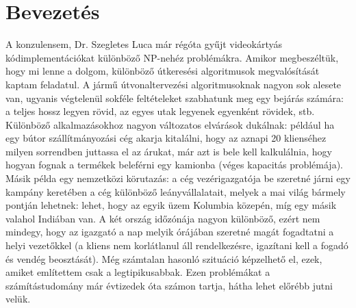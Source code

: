 \chapter{Bevezetés}

A konzulensem, Dr. Szegletes Luca már régóta gyűjt videokártyás kódimplementációkat különböző NP-nehéz problémákra. Amikor megbeszéltük, hogy mi lenne a dolgom, különböző útkeresési algoritmusok megvalósítását kaptam feladatul. A jármű útvonaltervezési algoritmusoknak nagyon sok alesete van, ugyanis végtelenül sokféle feltételeket szabhatunk meg egy bejárás számára: a teljes hossz legyen rövid, az egyes utak legyenek egyenként rövidek, stb. Különböző alkalmazásokhoz nagyon változatos elvárások dukálnak: például ha egy bútor szállítmányozási cég akarja kitalálni, hogy az aznapi 20 klienséhez milyen sorrendben juttassa el az árukat, már azt is bele kell kalkulálnia, hogy hogyan fognak a termékek beleférni egy kamionba (véges kapacitás problémája). Másik példa egy nemzetközi körutazás: a cég vezérigazgatója be szeretné járni egy kampány keretében a cég különböző leányvállalatait, melyek a mai világ bármely pontján lehetnek: lehet, hogy az egyik üzem Kolumbia közepén, míg egy másik valahol Indiában van. A két ország időzónája nagyon különböző, ezért nem mindegy, hogy az igazgató a nap melyik órájában szeretné magát fogadtatni a helyi vezetőkkel (a kliens nem korlátlanul áll rendelkezésre, igazítani kell a fogadó és vendég beosztását). Még számtalan hasonló szituáció képzelhető el, ezek, amiket említettem csak a legtipikusabbak. Ezen problémákat a számítástudomány már évtizedek óta számon tartja, hátha lehet előrébb jutni velük. 

